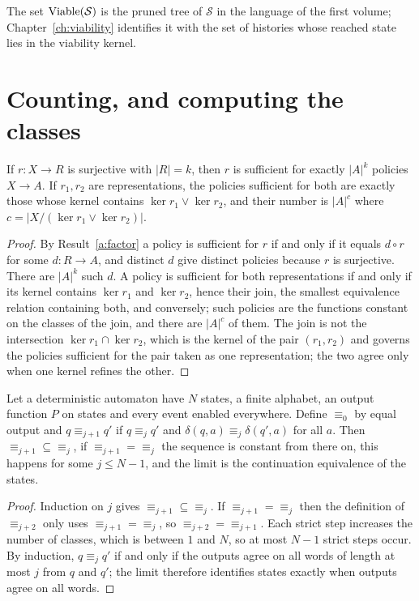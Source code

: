 The set $\operatorname{Viable}(\mathcal S)$ is the pruned tree of $\mathcal S$ in the language of the first volume; Chapter~\ref{ch:viability} identifies it with the set of histories whose reached state lies in the viability kernel.

\section{Counting, and computing the classes}

\begin{newresult}\label{a:count}
If $r:X\to R$ is surjective with $|R|=k$, then $r$ is sufficient for exactly $|A|^{k}$ policies $X\to A$. If $r_1,r_2$ are representations, the policies sufficient for both are exactly those whose kernel contains $\ker r_1\vee\ker r_2$, and their number is $|A|^{c}$ where $c=|X/(\ker r_1\vee\ker r_2)|$.
\end{newresult}
\begin{proof}
By Result~\ref{a:factor} a policy is sufficient for $r$ if and only if it equals $d\circ r$ for some $d:R\to A$, and distinct $d$ give distinct policies because $r$ is surjective. There are $|A|^{k}$ such $d$. A policy is sufficient for both representations if and only if its kernel contains $\ker r_1$ and $\ker r_2$, hence their join, the smallest equivalence relation containing both, and conversely; such policies are the functions constant on the classes of the join, and there are $|A|^{c}$ of them. The join is not the intersection $\ker r_1\cap\ker r_2$, which is the kernel of the pair $(r_1,r_2)$ and governs the policies sufficient for the pair taken as one representation; the two agree only when one kernel refines the other.
\end{proof}

\begin{established}\label{a:moore}
Let a deterministic automaton have $N$ states, a finite alphabet, an output function $P$ on states and every event enabled everywhere. Define $\equiv_0$ by equal output and $q\equiv_{j+1}q'$ if $q\equiv_jq'$ and $\delta(q,a)\equiv_j\delta(q',a)$ for all $a$. Then $\equiv_{j+1}\subseteq\equiv_j$, if $\equiv_{j+1}=\equiv_j$ the sequence is constant from there on, this happens for some $j\le N-1$, and the limit is the continuation equivalence of the states.
\end{established}
\begin{proof}
Induction on $j$ gives $\equiv_{j+1}\subseteq\equiv_j$. If $\equiv_{j+1}=\equiv_j$ then the definition of $\equiv_{j+2}$ only uses $\equiv_{j+1}=\equiv_j$, so $\equiv_{j+2}=\equiv_{j+1}$. Each strict step increases the number of classes, which is between $1$ and $N$, so at most $N-1$ strict steps occur. By induction, $q\equiv_jq'$ if and only if the outputs agree on all words of length at most $j$ from $q$ and $q'$; the limit therefore identifies states exactly when outputs agree on all words.
\end{proof}

